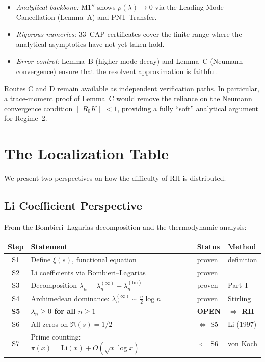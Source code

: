 \documentclass[12pt,a4paper]{article}
\theoremstyle{definition}
\theoremstyle{remark}
\begin{document}
\begin{itemize}
  \item \emph{Analytical backbone:} M1$''$ shows $\rho(\lambda) \to 0$ via the Leading-Mode Cancellation (Lemma~A) and PNT Transfer.
  \item \emph{Rigorous numerics:} 33~CAP certificates cover the finite range where the analytical asymptotics have not yet taken hold.
  \item \emph{Error control:} Lemma~B (higher-mode decay) and Lemma~C (Neumann convergence) ensure that the resolvent approximation is faithful.
\end{itemize}

\noindent Routes C and D remain available as independent verification paths. In particular, a trace-moment proof of Lemma~C would remove the reliance on the Neumann convergence condition $\|R_0 K\| < 1$, providing a fully ``soft'' analytical argument for Regime~2.


\section{The Localization Table}
\label{sec:localization}

We present two perspectives on how the difficulty of RH is distributed.

\subsection{Li Coefficient Perspective}

From the Bombieri--Lagarias decomposition and the thermodynamic analysis:

\begin{center}
\renewcommand{\arraystretch}{1.2}
\begin{tabular}{c|l|l|l}
\textbf{Step} & \textbf{Statement} & \textbf{Status} & \textbf{Method} \\\hline
S1 & Define $\xi(s)$, functional equation & proven & definition \\
S2 & Li coefficients via Bombieri--Lagarias & proven & \cite{BombieriLagarias1999} \\
S3 & Decomposition $\lambda_n = \lambda_n^{(\infty)} + \lambda_n^{(\mathrm{fin})}$ & proven & Part~I \\
S4 & Archimedean dominance: $\lambda_n^{(\infty)} \sim \frac{n}{2}\log n$ & proven & Stirling \\
\textbf{S5} & \textbf{$\lambda_n \geq 0$ for all $n \geq 1$} & \textbf{OPEN} & \textbf{$\Longleftrightarrow$ RH} \\
S6 & All zeros on $\Re(s) = 1/2$ & $\Leftrightarrow$ S5 & Li (1997) \\
S7 & Prime counting: $\pi(x) = \mathrm{Li}(x) + O(\sqrt{x}\log x)$ & $\Leftarrow$ S6 & von Koch
\end{tabular}
\end{center}
\end{document}
